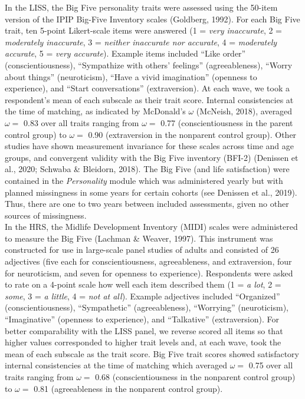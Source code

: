 \documentclass[
  english,
  man, noextraspace]{apa7}
\begin{document}
In the LISS, the Big Five personality traits were assessed using the 50-item version of the IPIP Big-Five Inventory scales (Goldberg, 1992). For each Big Five trait, ten 5-point Likert-scale items were answered (1 = \emph{very inaccurate}, 2 = \emph{moderately inaccurate}, 3 = \emph{neither inaccurate nor accurate}, 4 = \emph{moderately accurate}, 5 = \emph{very accurate}). Example items included \enquote{Like order} (conscientiousness), \enquote{Sympathize with others' feelings} (agreeableness), \enquote{Worry about things} (neuroticism), \enquote{Have a vivid imagination} (openness to experience), and \enquote{Start conversations} (extraversion). At each wave, we took a respondent's mean of each subscale as their trait score. Internal consistencies at the time of matching, as indicated by McDonald's \(\omega\) (McNeish, 2018), averaged \(\omega =\) 0.83 over all traits ranging from \(\omega =\) 0.77 (conscientiousness in the parent control group) to \(\omega =\) 0.90 (extraversion in the nonparent control group). Other studies have shown measurement invariance for these scales across time and age groups, and convergent validity with the Big Five inventory (BFI-2) (Denissen et al., 2020; Schwaba \& Bleidorn, 2018). The Big Five (and life satisfaction) were contained in the \emph{Personality} module which was administered yearly but with planned missingness in some years for certain cohorts (see Denissen et al., 2019). Thus, there are one to two years between included assessments, given no other sources of missingness.\\
In the HRS, the Midlife Development Inventory (MIDI) scales were administered to measure the Big Five (Lachman \& Weaver, 1997). This instrument was constructed for use in large-scale panel studies of adults and consisted of 26 adjectives (five each for conscientiousness, agreeableness, and extraversion, four for neuroticism, and seven for openness to experience). Respondents were asked to rate on a 4-point scale how well each item described them (1 = \emph{a lot}, 2 = \emph{some}, 3 = \emph{a little}, 4 = \emph{not at all}). Example adjectives included \enquote{Organized} (conscientiousness), \enquote{Sympathetic} (agreeableness), \enquote{Worrying} (neuroticism), \enquote{Imaginative} (openness to experience), and \enquote{Talkative} (extraversion). For better comparability with the LISS panel, we reverse scored all items so that higher values corresponded to higher trait levels and, at each wave, took the mean of each subscale as the trait score. Big Five trait scores showed satisfactory internal consistencies at the time of matching which averaged \(\omega =\) 0.75 over all traits ranging from \(\omega =\) 0.68 (conscientiousness in the nonparent control group) to \(\omega =\) 0.81 (agreeableness in the nonparent control group).
\end{document}
